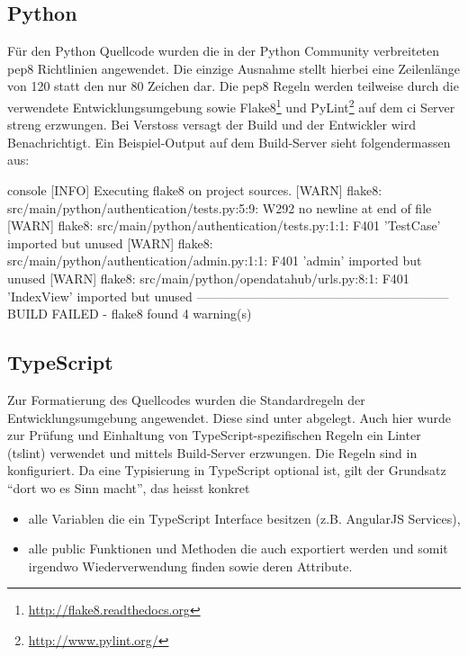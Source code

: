 \subsection{Python}
Für den Python Quellcode wurden die in der Python Community verbreiteten \gls{pep8} Richtlinien angewendet. Die einzige Ausnahme stellt hierbei eine Zeilenlänge von 120 statt den nur 80 Zeichen dar. Die \gls{pep8} Regeln werden teilweise durch die verwendete Entwicklungsumgebung sowie Flake8\footnote{\url{http://flake8.readthedocs.org}} und PyLint\footnote{\url{http://www.pylint.org/}} auf dem \gls{ci} Server streng erzwungen. Bei Verstoss versagt der Build und der Entwickler wird Benachrichtigt. Ein Beispiel-Output auf dem Build-Server sieht folgendermassen aus:

\begin{src}{console}
[INFO]  Executing flake8 on project sources.
[WARN]  flake8: src/main/python/authentication/tests.py:5:9: W292 no newline at end of file
[WARN]  flake8: src/main/python/authentication/tests.py:1:1: F401 'TestCase' imported but unused
[WARN]  flake8: src/main/python/authentication/admin.py:1:1: F401 'admin' imported but unused
[WARN]  flake8: src/main/python/opendatahub/urls.py:8:1: F401 'IndexView' imported but unused
------------------------------------------------------------
BUILD FAILED - flake8 found 4 warning(s)
\end{src}


\subsection{TypeScript}
Zur Formatierung des Quellcodes wurden die Standardregeln der Entwicklungsumgebung angewendet. Diese sind unter  abgelegt. Auch hier wurde zur Prüfung und Einhaltung von TypeScript-spezifischen Regeln ein Linter (tslint) verwendet und mittels Build-Server erzwungen. Die Regeln sind in  konfiguriert. Da eine Typisierung in TypeScript optional ist, gilt der Grundsatz ``dort wo es Sinn macht'', das heisst konkret
\begin{itemize}
\item alle Variablen die ein TypeScript Interface besitzen (z.B. AngularJS Services),
\item alle public Funktionen und Methoden die auch exportiert werden und somit irgendwo Wiederverwendung finden sowie deren Attribute.
\end{itemize}

